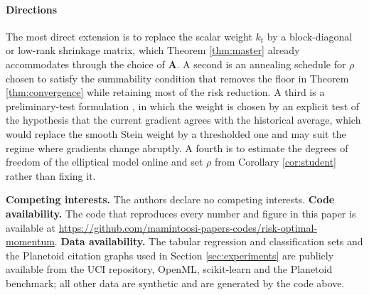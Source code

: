 \documentclass[pdflatex,sn-mathphys-num]{sn-jnl}%
\theoremstyle{thmstyleone}%
\theoremstyle{thmstyletwo}%
\theoremstyle{thmstylethree}%
\newcommand{\rev}[1]{{\color{blue}#1}}
\begin{document}
\paragraph{Directions}

The most direct extension is to replace the scalar weight $k_t$ by a block-diagonal or low-rank shrinkage matrix, which Theorem \ref{thm:master} already accommodates through the choice of $\bm A$. A second is an annealing schedule for $\rho$ chosen to satisfy the summability condition that removes the floor in Theorem \ref{thm:convergence} while retaining most of the risk reduction. A third is a preliminary-test formulation \cite{saleh2006, judge1978}, in which the weight is chosen by an explicit test of the hypothesis that the current gradient agrees with the historical average, which would replace the smooth Stein weight by a thresholded one and may suit the regime where gradients change abruptly. A fourth is to estimate the degrees of freedom of the elliptical model online and set $\rho$ from Corollary \ref{cor:student} rather than fixing it.

\backmatter



\rev{\textbf{Competing interests.}} The authors declare no competing interests. \rev{\textbf{Code availability.}} The code that reproduces every number and figure in this paper is available at \url{https://github.com/mamintoosi-papers-codes/risk-optimal-momentum}. \rev{\textbf{Data availability.} The tabular regression and classification sets and the Planetoid citation graphs used in Section \ref{sec:experiments} are publicly available from the UCI repository, OpenML, scikit-learn and the Planetoid benchmark; all other data are synthetic and are generated by the code above.}
\end{document}
